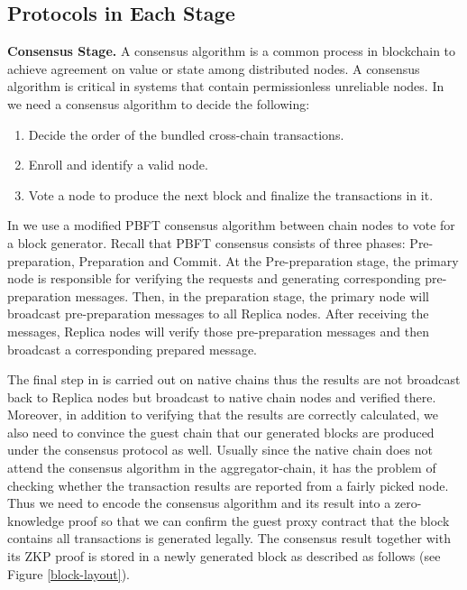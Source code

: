 \subsection{Protocols in Each Stage}
\textbf{Consensus Stage.}
\label{consensus-stage}
A consensus algorithm is a common process in blockchain to achieve agreement on value or state among distributed nodes. A consensus algorithm is critical in systems that contain permissionless unreliable nodes. In \dprotocol we need a consensus algorithm to decide the following:

\begin{enumerate}[leftmargin=*]
\item Decide the order of the bundled cross-chain transactions.
\item Enroll and identify a valid node.
\item Vote a node to produce the next block and finalize the transactions in it. 
\end{enumerate}

In \dprotocol we use a modified PBFT \cite{castro1999practical} consensus algorithm between chain nodes to vote for a block generator. Recall that PBFT consensus consists of three phases: Pre-preparation, Preparation and Commit. At the Pre-preparation stage, the primary node is responsible for verifying the requests and generating corresponding pre-preparation messages. Then, in the preparation stage, the primary node will broadcast pre-preparation messages to all Replica nodes. After receiving the messages, Replica nodes will verify those pre-preparation messages and then broadcast a corresponding prepared message.

The final step in \dprotocol is carried out on native chains thus the results are not broadcast back to Replica nodes but broadcast to native chain nodes and verified there. Moreover, in addition to verifying that the results are correctly calculated, we also need to convince the guest chain that our generated blocks are produced under the consensus protocol as well. Usually since the native chain does not attend the consensus algorithm in the aggregator-chain, it has the problem of checking whether the transaction results are reported from a fairly picked node. Thus we need to encode the consensus algorithm and its result into a zero-knowledge proof so that we can confirm the guest proxy contract that the block contains all transactions is generated legally. The consensus result together with its ZKP proof is stored in a newly generated block as described as follows (see Figure \ref{block-layout}). 

